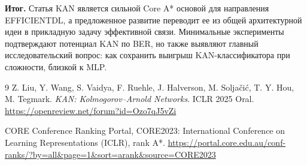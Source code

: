 \documentclass[11pt,a4paper]{article}
\begin{document}
\textbf{Итог.}
Статья KAN является сильной Core A* основой для направления EFFICIENTDL, а предложенное развитие переводит ее из общей архитектурной идеи в прикладную задачу эффективной связи. Минимальные эксперименты подтверждают потенциал KAN по BER, но также выявляют главный исследовательский вопрос: как сохранить выигрыш KAN-классификатора при сложности, близкой к MLP.

\begin{thebibliography}{9}
Z. Liu, Y. Wang, S. Vaidya, F. Ruehle, J. Halverson, M. Soljačić, T. Y. Hou, M. Tegmark.
\textit{KAN: Kolmogorov--Arnold Networks}. ICLR 2025 Oral.
\url{https://openreview.net/forum?id=Ozo7qJ5vZi}

CORE Conference Ranking Portal, CORE2023: International Conference on Learning Representations (ICLR), rank A*.
\url{https://portal.core.edu.au/conf-ranks/?by=all&page=1&sort=arank&source=CORE2023}
\end{thebibliography}
\end{document}
